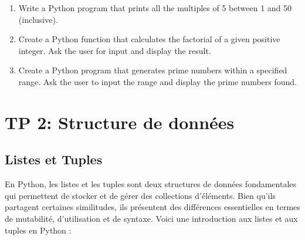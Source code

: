\documentclass[11pt]{article}
\begin{document}
    \begin{enumerate}
\def\labelenumi{\arabic{enumi}.}
\setcounter{enumi}{2}
\item
  Write a Python program that prints all the multiples of 5 between 1
  and 50 (inclusive).
\item
  Create a Python function that calculates the factorial of a given
  positive integer. Ask the user for input and display the result.
\item
  Create a Python program that generates prime numbers within a
  specified range. Ask the user to input the range and display the prime
  numbers found.
\end{enumerate}

    \hypertarget{tp-2-structure-de-donnuxe9es}{%
\section{TP 2: Structure de
données}\label{tp-2-structure-de-donnuxe9es}}

\hypertarget{listes-et-tuples}{%
\subsection{Listes et Tuples}\label{listes-et-tuples}}

En Python, les listes et les tuples sont deux structures de données
fondamentales qui permettent de stocker et de gérer des collections
d'éléments. Bien qu'ils partagent certaines similitudes, ils présentent
des différences essentielles en termes de mutabilité, d'utilisation et
de syntaxe. Voici une introduction aux listes et aux tuples en Python :
\end{document}
